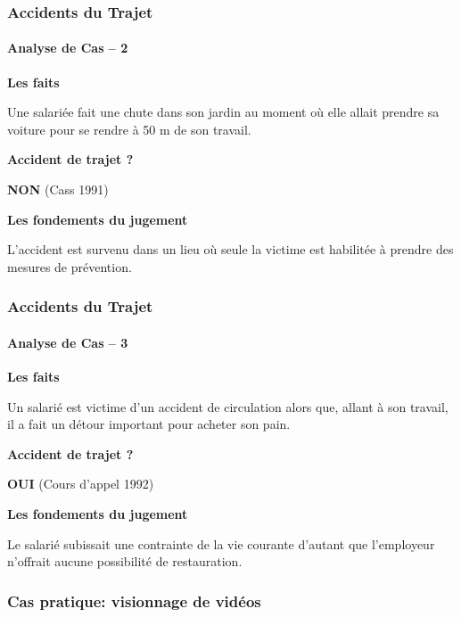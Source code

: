 \documentclass{beamer}
\begin{document}
\begin{frame}
\frametitle{Accidents du Trajet}
\framesubtitle{Analyse de Cas – 2}

\textbf{Les faits}

Une salariée fait une chute dans son jardin au moment où elle allait prendre sa  voiture pour se rendre à 50 m de son travail. 

\textbf{Accident de trajet ? }

\textbf{NON} (Cass 1991)

\textbf{Les fondements du jugement}

L’accident est survenu dans un lieu où seule la victime est habilitée à prendre des mesures de prévention.

\end{frame}

\begin{frame}
\frametitle{Accidents du Trajet}
\framesubtitle{Analyse de Cas – 3}

\textbf{Les faits}

Un salarié est victime d’un accident de circulation alors que, allant à son travail, il a fait un détour important pour acheter son pain. 



\textbf{Accident de trajet ? }

\textbf{OUI } (Cours d’appel 1992)

\textbf{Les fondements du jugement}

Le salarié subissait une contrainte de la vie courante d’autant que l’employeur n’offrait aucune  possibilité de restauration.
\end{frame}

\begin{frame}
\frametitle{Cas pratique: visionnage de vidéos}


\end{frame}
\end{document}
